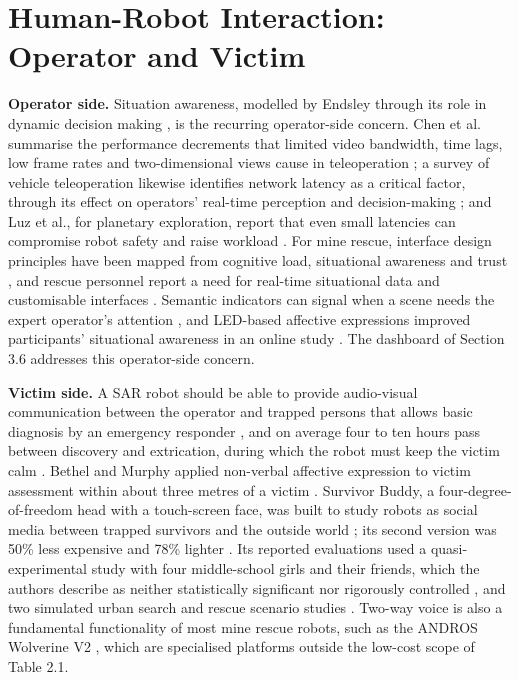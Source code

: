 \section{Human-Robot Interaction: Operator and Victim}

\textbf{Operator side.} Situation awareness, modelled by Endsley through its role in dynamic decision making \cite{endsley1995}, is the recurring operator-side concern. Chen et al. summarise the performance decrements that limited video bandwidth, time lags, low frame rates and two-dimensional views cause in teleoperation \cite{chen2007}; a survey of vehicle teleoperation likewise identifies network latency as a critical factor, through its effect on operators' real-time perception and decision-making \cite{kamtam2024}; and Luz et al., for planetary exploration, report that even small latencies can compromise robot safety and raise workload \cite{luz2023}. For mine rescue, interface design principles have been mapped from cognitive load, situational awareness and trust \cite{bakzadeh2025}, and rescue personnel report a need for real-time situational data and customisable interfaces \cite{bakzadeh2026b}. Semantic indicators can signal when a scene needs the expert operator's attention \cite{ruan2025}, and LED-based affective expressions improved participants' situational awareness in an online study \cite{akgun2023}. The dashboard of Section 3.6 addresses this operator-side concern.

\textbf{Victim side.} A SAR robot should be able to provide audio-visual communication between the operator and trapped persons that allows basic diagnosis by an emergency responder \cite{schneider2016}, and on average four to ten hours pass between discovery and extrication, during which the robot must keep the victim calm \cite{srinivasan2012}. Bethel and Murphy applied non-verbal affective expression to victim assessment within about three metres of a victim \cite{bethel2007}. Survivor Buddy, a four-degree-of-freedom head with a touch-screen face, was built to study robots as social media between trapped survivors and the outside world \cite{murphy2010}; its second version was 50\% less expensive and 78\% lighter \cite{murphy2011}. Its reported evaluations used a quasi-experimental study with four middle-school girls and their friends, which the authors describe as neither statistically significant nor rigorously controlled \cite{murphy2010}, and two simulated urban search and rescue scenario studies \cite{srinivasan2012}. Two-way voice is also a fundamental functionality of most mine rescue robots, such as the ANDROS Wolverine V2 \cite{bakzadeh2026}, which are specialised platforms outside the low-cost scope of Table 2.1.

